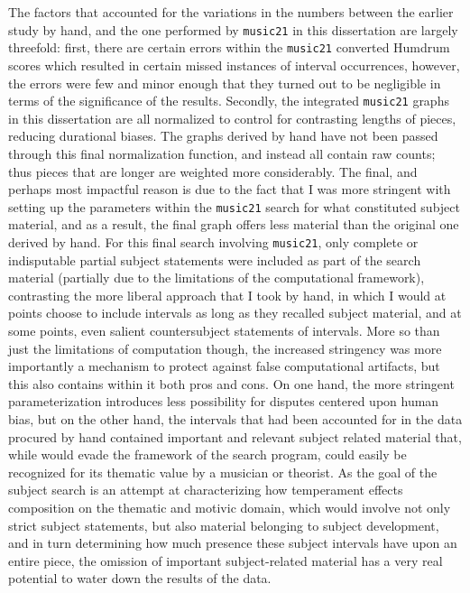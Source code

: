 The factors that accounted for the variations in the numbers between the
earlier study by hand, and the one performed by \texttt{music21} in this
dissertation are largely threefold: first, there are certain errors
within the \texttt{music21} converted Humdrum scores which resulted in
certain missed instances of interval occurrences, however, the errors
were few and minor enough that they turned out to be negligible in terms
of the significance of the results. Secondly, the integrated
\texttt{music21} graphs in this dissertation are all normalized to
control for contrasting lengths of pieces, reducing durational biases.
The graphs derived by hand have not been passed through this final
normalization function, and instead all contain raw counts; thus pieces
that are longer are weighted more considerably. The final, and perhaps
most impactful reason is due to the fact that I was more stringent with
setting up the parameters within the \texttt{music21} search for what
constituted subject material, and as a result, the final graph offers
less material than the original one derived by hand. For this final
search involving \texttt{music21}, only complete or indisputable partial
subject statements were included as part of the search material
(partially due to the limitations of the computational framework),
contrasting the more liberal approach that I took by hand, in which I
would at points choose to include intervals as long as they recalled
subject material, and at some points, even salient countersubject
statements of intervals. More so than just the limitations of
computation though, the increased stringency was more importantly a
mechanism to protect against false computational artifacts, but this
also contains within it both pros and cons. On one hand, the more
stringent parameterization introduces less possibility for disputes
centered upon human bias, but on the other hand, the intervals that had
been accounted for in the data procured by hand contained important and
relevant subject related material that, while would evade the framework
of the search program, could easily be recognized for its thematic value
by a musician or theorist. As the goal of the subject search is an
attempt at characterizing how temperament effects composition on the
thematic and motivic domain, which would involve not only strict subject
statements, but also material belonging to subject development, and in
turn determining how much presence these subject intervals have upon an
entire piece, the omission of important subject-related material has a
very real potential to water down the results of the data.

